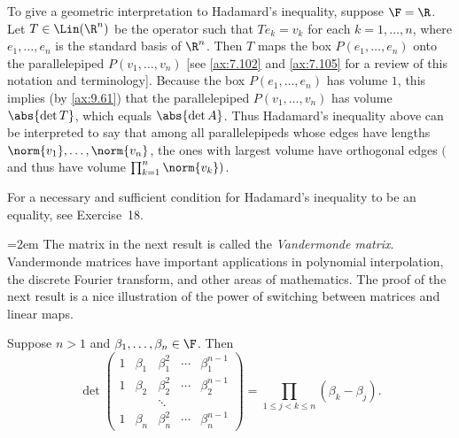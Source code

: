 To give a geometric interpretation to Hadamard's inequality, suppose $\F=\R$.
Let $T\in\Lin(\R^n)$ be the operator such that $Te_k=v_k$ for each
$k=1,\dots,n$, where $e_1,\dots,e_n$ is the standard basis of $\R^n$. Then $T$
maps the box $P(e_1,\dots,e_n)$ onto the parallelepiped $P(v_1,\dots,v_n)$
[see \ref{ax:7.102} and \ref{ax:7.105} for a review of this notation and
terminology]. Because the box $P(e_1,\dots,e_n)$ has volume $1$, this implies
(by \ref{ax:9.61}) that the parallelepiped $P(v_1,\dots,v_n)$ has volume
$\abs{\det T}$, which equals $\abs{\det A}$. Thus Hadamard's inequality above
can be interpreted to say that among all parallelepipeds whose edges have
lengths $\norm{v_1},\dots,\norm{v_n}$, the ones with largest volume have
orthogonal edges $($and thus have volume
$\prod_{k=1}^n\norm{v_k})$.

For a necessary and sufficient condition for Hadamard's inequality to be an
equality, see Exercise~18.

\begingroup\emergencystretch=2em
The matrix in the next result is called the \emph{Vandermonde matrix}.
Vandermonde matrices have important applications in polynomial interpolation,
the discrete Fourier transform, and other areas of mathematics. The proof of
the next result is a nice illustration of the power of switching between
matrices and linear maps.\par\endgroup

\begin{result}\label{ax:9.67}
Suppose $n>1$ and $\beta_1,\dots,\beta_n\in\F$. Then
\[ \det\begin{pmatrix}
     1 & \beta_1 & \beta_1^2 & \cdots & \beta_1^{n-1}\\
     1 & \beta_2 & \beta_2^2 & \cdots & \beta_2^{n-1}\\
       &         & \ddots    &        &              \\
     1 & \beta_n & \beta_n^2 & \cdots & \beta_n^{n-1}
   \end{pmatrix}
   = \prod_{1\le j<k\le n}(\beta_k-\beta_j). \]
\end{result}

